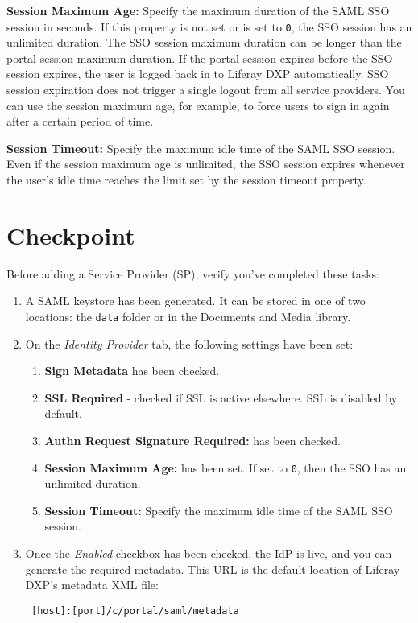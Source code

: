 \textbf{Session Maximum Age:} Specify the maximum duration of the SAML
SSO session in seconds. If this property is not set or is set to
\texttt{0}, the SSO session has an unlimited duration. The SSO session
maximum duration can be longer than the portal session maximum duration.
If the portal session expires before the SSO session expires, the user
is logged back in to Liferay DXP automatically. SSO session expiration
does not trigger a single logout from all service providers. You can use
the session maximum age, for example, to force users to sign in again
after a certain period of time.

\textbf{Session Timeout:} Specify the maximum idle time of the SAML SSO
session. Even if the session maximum age is unlimited, the SSO session
expires whenever the user's idle time reaches the limit set by the
session timeout property.

\section{Checkpoint}\label{checkpoint}

Before adding a Service Provider (SP), verify you've completed these
tasks:

\begin{enumerate}
\def\labelenumi{\arabic{enumi}.}
\item
  A SAML keystore has been generated. It can be stored in one of two
  locations: the \texttt{data} folder or in the Documents and Media
  library.
\item
  On the \emph{Identity Provider} tab, the following settings have been
  set:

  \begin{enumerate}
  \def\labelenumii{\alph{enumii}.}
  \item
    \textbf{Sign Metadata} has been checked.
  \item
    \textbf{SSL Required} - checked if SSL is active elsewhere. SSL is
    disabled by default.
  \item
    \textbf{Authn Request Signature Required:} has been checked.
  \item
    \textbf{Session Maximum Age:} has been set. If set to \texttt{0},
    then the SSO has an unlimited duration.
  \item
    \textbf{Session Timeout:} Specify the maximum idle time of the SAML
    SSO session.
  \end{enumerate}
\item
  Once the \emph{Enabled} checkbox has been checked, the IdP is live,
  and you can generate the required metadata. This URL is the default
  location of Liferay DXP's metadata XML file:

\begin{verbatim}
 [host]:[port]/c/portal/saml/metadata 
\end{verbatim}
\end{enumerate}

